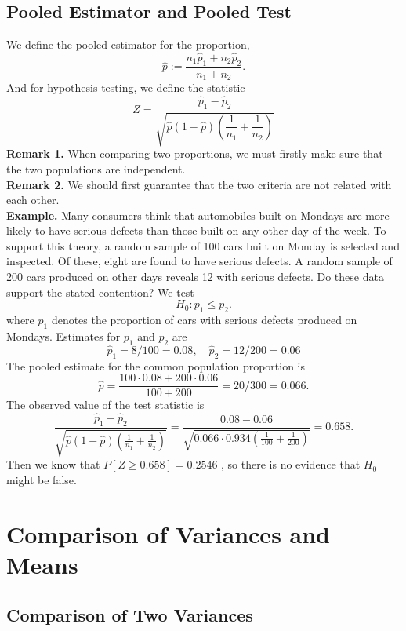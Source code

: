 \documentclass[a4paper,12pt]{article}
\begin{document}
\subsection{Pooled Estimator and Pooled Test}
    We define the pooled estimator for the proportion,
    \begin{equation}
    \widehat{p}:=\frac{n_1 \widehat{p}_1+n_2 \widehat{p}_2}{n_1+n_2} .
    \end{equation}
    And for hypothesis testing, we define the statistic
    \begin{equation}
        Z=\frac{\widehat{p}_1-\widehat{p}_2}{\sqrt{\widehat{p}(1-\widehat{p})\left(\dfrac{1}{n_1}+\dfrac{1}{n_2}\right)}}
        \end{equation}
    \textbf{Remark 1.} When comparing two proportions, we must firstly make sure that the two populations are independent.\\
    \textbf{Remark 2.} We should first guarantee that the two criteria are not related with each other.\\
   \textbf{Example.} Many consumers think that automobiles built on Mondays are more likely to have serious defects than those built on any other day of the week. To support this theory, a random sample of 100 cars built on Monday is selected and inspected. Of these, eight are found to have serious defects. A random sample of 200 cars produced on other days reveals 12 with serious defects. Do these data support the stated contention?
We test
$$
H_0: p_1 \leq p_2 .
$$
where $p_1$ denotes the proportion of cars with serious defects produced on Mondays.
Estimates for $p_1$ and $p_2$ are
$$
\widehat{p}_1=8 / 100=0.08, \quad \widehat{p}_2=12 / 200=0.06
$$
The pooled estimate for the common population proportion is
$$
\widehat{p}=\frac{100 \cdot 0.08+200 \cdot 0.06}{100+200}=20 / 300=0.066 .
$$
The observed value of the test statistic is
$$
\frac{\widehat{p}_1-\widehat{p}_2}{\sqrt{\widehat{p}(1-\widehat{p})\left(\frac{1}{n_1}+\frac{1}{n_2}\right)}}=\frac{0.08-0.06}{\sqrt{0.066 \cdot 0.934\left(\frac{1}{100}+\frac{1}{200}\right)}}=0.658 .
$$
Then we know that $P[Z \geq 0.658] = 0.2546$ , so there is no evidence that $H_0$ might be false.



\section{Comparison of Variances and Means}
\subsection{Comparison of Two Variances}
\end{document}
